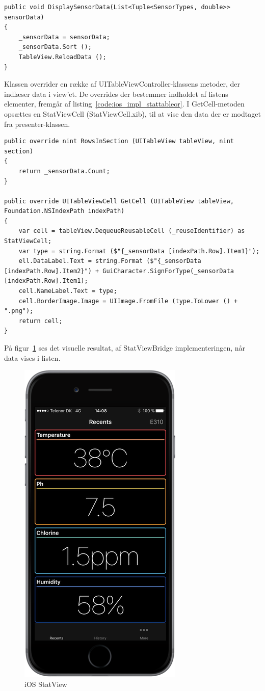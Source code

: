 \begin{lstlisting}[caption={DisplaySensorData(...)},label={code:ios_impl_statdisplay}]
public void DisplaySensorData(List<Tuple<SensorTypes, double>> sensorData)
{
	_sensorData = sensorData;
	_sensorData.Sort ();
	TableView.ReloadData ();
}
\end{lstlisting}

Klassen overrider en række af UITableViewController-klassens metoder, der indlæser data i view'et. De overrides der bestemmer indholdet af listens elementer, fremgår af listing~\ref{code:ios_impl_stattableor}. I GetCell-metoden opsættes en StatViewCell (StatViewCell.xib), til at vise den data der er modtaget fra presenter-klassen.

\begin{lstlisting}[caption={Overrides af UITableViewController-metoder i StatViewBridge},label={code:ios_impl_stattableor}]
public override nint RowsInSection (UITableView tableView, nint section)
{
	return _sensorData.Count;
}

public override UITableViewCell GetCell (UITableView tableView, Foundation.NSIndexPath indexPath)
{	
	var cell = tableView.DequeueReusableCell (_reuseIdentifier) as StatViewCell;
	var type = string.Format ($"{_sensorData [indexPath.Row].Item1}");
	ell.DataLabel.Text = string.Format ($"{_sensorData [indexPath.Row].Item2}") + GuiCharacter.SignForType(_sensorData [indexPath.Row].Item1);
	cell.NameLabel.Text = type;
	cell.BorderImage.Image = UIImage.FromFile (type.ToLower () + ".png");
	return cell;
}
\end{lstlisting}

På figur~\ref{fig:ios_imp_statview} ses det visuelle resultat, af StatViewBridge implementeringen, når data vises i listen.

\begin{figure}
	\centering
	\includegraphics[width=0.4\linewidth]{figs/implementering/ios_imp_statview}
	\caption{iOS StatView}
	\label{fig:ios_imp_statview}
\end{figure}

